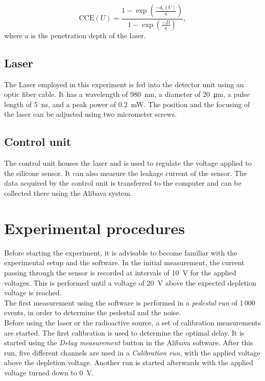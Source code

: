 \begin{equation}
	\mathrm{CCE}(U)=\frac{1-\exp\left(\frac{-d_{\mathrm{c}}(U)}{a}\right)}{1-\exp\left(\frac{-D}{a}\right)},
	\label{eq:charge_col_eff}
\end{equation}
where $a$ is the penetration depth of the laser.

\subsection{Laser}
The Laser employed in this experiment is fed into the detector unit using an optic fiber cable. It has a wavelength of \qty{980}{\nano\meter}, a diameter of \qty{20}{\micro\meter}, a pulse length of \qty{5}{\nano\second}, and a peak power of \qty{0.2}{\milli\watt}. The position and the focusing of the laser can be adjusted using two micrometer screws.
\subsection{Control unit}
The control unit houses the laser and is used to regulate the voltage applied to the silicone sensor. It can also measure the leakage current of the sensor. The data acquired by the control unit is transferred to the computer and can be collected there using the Alibava system.

\section{Experimental procedures}
\label{sec:exec}
Before starting the experiment, it is advisable to become familiar with the experimental setup and the software. In the initial measurement, the current passing through the sensor is recorded at intervals of \qty{10}{\volt} for the applied voltages. This is performed until a voltage of \qty{20}{\volt} above the expected depletion voltage is reached.\\

The first measurement using the software is performed in a \textit{pedestal run} of 1\,000 events, in order to determine the pedestal and the noise.\\

Before using the laser or the radioactive source, a set of calibration measurements are started. The first calibration is used to determine the optimal delay. It is started using the \textit{Delay measurement} button in the Alibava software. After this run, five different channels are used in a \textit{Calibration run}, with the applied voltage above the depletion voltage. Another run is started afterwards with the applied voltage turned down to \qty{0}{\volt}.\\

